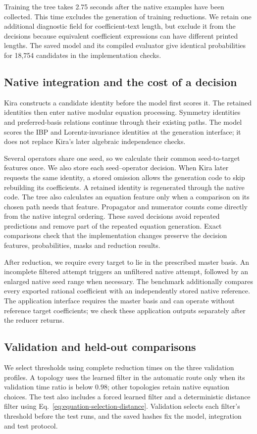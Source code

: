 Training the tree takes 2.75 seconds after the native examples have
been collected. This time excludes the generation of training reductions.
We retain one additional diagnostic field for coefficient-text length,
but exclude it from the decisions because equivalent coefficient
expressions can have different printed lengths. The saved model and
its compiled evaluator give identical probabilities for 18,754 candidates
in the implementation checks.

\subsection{Native integration and the cost of a decision}
Kira constructs a candidate identity before the model first scores it.
The retained identities then enter native modular equation processing.
Symmetry identities and preferred-basis relations continue through their
existing paths. The model scores the IBP and Lorentz-invariance identities
at the generation interface; it does not replace Kira's later algebraic
independence checks.

Several operators share one seed, so we calculate their common
seed-to-target features once. We also store each seed--operator decision.
When Kira later requests the same identity, a stored omission allows the
generation code to skip rebuilding its coefficients. A retained identity
is regenerated through the native code. The tree also calculates an equation feature only when a comparison
on its chosen path needs that feature. Propagator and numerator counts
come directly from the native integral ordering. These saved decisions avoid
repeated predictions and remove part of the repeated equation generation.
Exact comparisons check that the implementation changes preserve the
decision features, probabilities, masks and reduction results.

After reduction, we require every target to lie in the prescribed master
basis. An incomplete filtered attempt triggers an unfiltered native
attempt, followed by an enlarged native seed range when necessary.
The benchmark additionally compares every exported rational coefficient
with an independently stored native reference. The application interface
requires the master basis and can operate without reference target
coefficients; we check these application outputs separately after the
reducer returns.

\subsection{Validation and held-out comparisons}
We select thresholds using complete reduction times on the three
validation profiles. A topology uses the learned filter in the automatic
route only when its validation time ratio is below $0.98$; other
topologies retain native equation choices. The test also includes a
forced learned filter and a deterministic distance filter using
Eq.~\eqref{eq:equation-selection-distance}. Validation selects each
filter's threshold before the test runs, and the saved hashes fix the
model, integration and test protocol.


